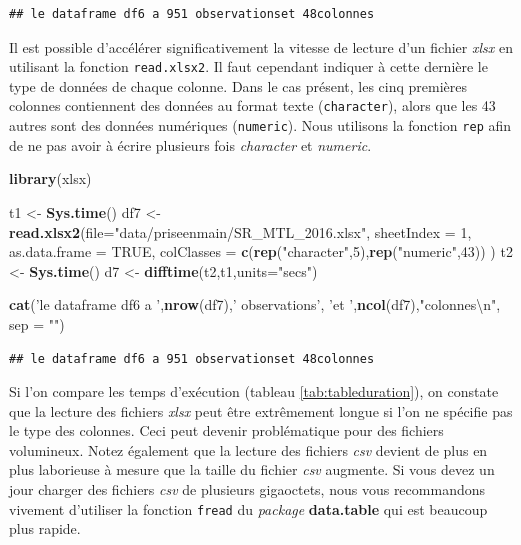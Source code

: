 \documentclass[
  11pt,
  french,
]{book}
\makeatletter
\newenvironment{Shaded}{\begin{snugshade}}{\end{snugshade}}
\newcommand{\CharTok}[1]{\textcolor[rgb]{0.31,0.60,0.02}{#1}}
\newcommand{\DataTypeTok}[1]{\textcolor[rgb]{0.13,0.29,0.53}{#1}}
\newcommand{\DecValTok}[1]{\textcolor[rgb]{0.00,0.00,0.81}{#1}}
\newcommand{\KeywordTok}[1]{\textcolor[rgb]{0.13,0.29,0.53}{\textbf{#1}}}
\newcommand{\NormalTok}[1]{#1}
\newcommand{\OtherTok}[1]{\textcolor[rgb]{0.56,0.35,0.01}{#1}}
\newcommand{\StringTok}[1]{\textcolor[rgb]{0.31,0.60,0.02}{#1}}
\newenvironment{kframe}{%
\medskip{}
\setlength{\fboxsep}{.8em}
 \def\at@end@of@kframe{}%
 \ifinner\ifhmode%
  \def\at@end@of@kframe{\end{minipage}}%
  \begin{minipage}{\columnwidth}%
 \fi\fi%
 \def\FrameCommand##1{\hskip\@totalleftmargin \hskip-\fboxsep
 \colorbox{shadecolor}{##1}\hskip-\fboxsep
     \hskip-\linewidth \hskip-\@totalleftmargin \hskip\columnwidth}%
 \MakeFramed {\advance\hsize-\width
   \@totalleftmargin\z@ \linewidth\hsize
   \@setminipage}}%
 {\par\unskip\endMakeFramed%
 \at@end@of@kframe}
\renewenvironment{Shaded}{\begin{kframe}}{\end{kframe}}
\makeatother
\begin{document}
\begin{verbatim}
## le dataframe df6 a 951 observationset 48colonnes
\end{verbatim}

Il est possible d'accélérer significativement la vitesse de lecture d'un fichier \emph{xlsx} en utilisant la fonction \texttt{read.xlsx2}. Il faut cependant indiquer à cette dernière le type de données de chaque colonne. Dans le cas présent, les cinq premières colonnes contiennent des données au format texte (\texttt{character}), alors que les 43 autres sont des données numériques (\texttt{numeric}). Nous utilisons la fonction \texttt{rep} afin de ne pas avoir à écrire plusieurs fois \emph{character} et \emph{numeric}.

\begin{Shaded}
\begin{Highlighting}[]
\KeywordTok{library}\NormalTok{(xlsx)}

\NormalTok{t1 <-}\StringTok{ }\KeywordTok{Sys.time}\NormalTok{()}
\NormalTok{df7 <-}\StringTok{ }\KeywordTok{read.xlsx2}\NormalTok{(}\DataTypeTok{file=}\StringTok{"data/priseenmain/SR_MTL_2016.xlsx"}\NormalTok{,}
                  \DataTypeTok{sheetIndex =} \DecValTok{1}\NormalTok{, }
                  \DataTypeTok{as.data.frame =} \OtherTok{TRUE}\NormalTok{,}
                  \DataTypeTok{colClasses =} \KeywordTok{c}\NormalTok{(}\KeywordTok{rep}\NormalTok{(}\StringTok{"character"}\NormalTok{,}\DecValTok{5}\NormalTok{),}\KeywordTok{rep}\NormalTok{(}\StringTok{"numeric"}\NormalTok{,}\DecValTok{43}\NormalTok{))}
\NormalTok{                  )}
\NormalTok{t2 <-}\StringTok{ }\KeywordTok{Sys.time}\NormalTok{()}
\NormalTok{d7 <-}\StringTok{ }\KeywordTok{difftime}\NormalTok{(t2,t1,}\DataTypeTok{units=}\StringTok{"secs"}\NormalTok{)}

\KeywordTok{cat}\NormalTok{(}\StringTok{'le dataframe df6 a '}\NormalTok{,}\KeywordTok{nrow}\NormalTok{(df7),}\StringTok{' observations'}\NormalTok{,}
    \StringTok{'et '}\NormalTok{,}\KeywordTok{ncol}\NormalTok{(df7),}\StringTok{"colonnes}\CharTok{\textbackslash{}n}\StringTok{"}\NormalTok{, }\DataTypeTok{sep =} \StringTok{""}\NormalTok{)}
\end{Highlighting}
\end{Shaded}

\begin{verbatim}
## le dataframe df6 a 951 observationset 48colonnes
\end{verbatim}

Si l'on compare les temps d'exécution (tableau \ref{tab:tableduration}), on constate que la lecture des fichiers \emph{xlsx} peut être extrêmement longue si l'on ne spécifie pas le type des colonnes. Ceci peut devenir problématique pour des fichiers volumineux. Notez également que la lecture des fichiers \emph{csv} devient de plus en plus laborieuse à mesure que la taille du fichier \emph{csv} augmente. Si vous devez un jour charger des fichiers \emph{csv} de plusieurs gigaoctets, nous vous recommandons vivement d'utiliser la fonction \texttt{fread} du \emph{package} \textbf{data.table} qui est beaucoup plus rapide.
\end{document}
